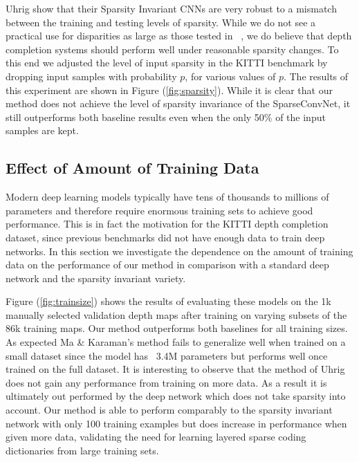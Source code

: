 Uhrig \etal show that their Sparsity Invariant CNNs are very robust to a mismatch between the training and testing levels of sparsity. While we do not see a practical use for disparities as large as those tested in ~\cite{uhrig}, we do believe that depth completion systems should perform well under reasonable sparsity changes. To this end we adjusted the level of input sparsity in the KITTI benchmark by dropping input samples with probability $p$, for various values of $p$. The results of this experiment are shown in Figure (\ref{fig:sparsity}). While it is clear that our method does not achieve the level of sparsity invariance of the SparseConvNet, it still outperforms both baseline results even when the only 50\% of the input samples are kept.
\subsection{Effect of Amount of Training Data}
\label{sec:effect-training-data}

Modern deep learning models typically have tens of thousands to millions of parameters and therefore require enormous training sets to achieve good performance. This is in fact the motivation for the KITTI depth completion dataset, since previous benchmarks did not have enough data to train deep networks. In this section we investigate the dependence on the amount of training data on the performance of our method in comparison with a standard deep network and the sparsity invariant variety.

Figure (\ref{fig:trainsize}) shows the results of evaluating these models on the 1k manually selected validation depth maps after training on varying subsets of the 86k training maps. Our method outperforms both baselines for all training sizes. As expected Ma \& Karaman's method fails to generalize well when trained on a small dataset since the model has ~3.4M parameters but performs well once trained on the full dataset. It is interesting to observe that the method of Uhrig \etal does not gain any performance from training on more data. As a result it is ultimately out performed by the deep network which does not take sparsity into account. Our method is able to perform comparably to the sparsity invariant network with only 100 training examples but does increase in performance when given more data, validating the need for learning layered sparse coding dictionaries from large training sets. 
